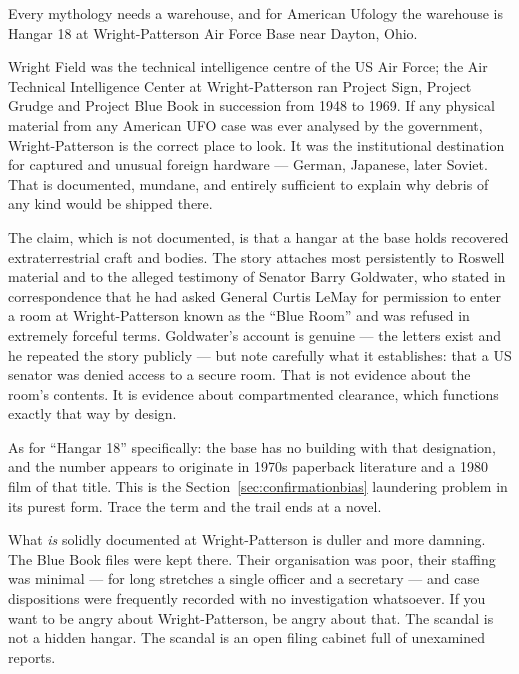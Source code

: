 Every mythology needs a warehouse, and for American Ufology the warehouse is Hangar 18 at
Wright-Patterson Air Force Base near Dayton, Ohio.

Wright Field was the technical intelligence centre of the US Air Force; the Air Technical
Intelligence Center at Wright-Patterson ran Project Sign, Project Grudge and Project Blue
Book in succession from 1948 to 1969. If any physical material from any American UFO case
was ever analysed by the government, Wright-Patterson is the correct place to look. It was
the institutional destination for captured and unusual foreign hardware --- German,
Japanese, later Soviet. That is documented, mundane, and entirely sufficient to explain
why debris of any kind would be shipped there.

The claim, which is not documented, is that a hangar at the base holds recovered
extraterrestrial craft and bodies. The story attaches most persistently to Roswell
material and to the alleged testimony of Senator Barry Goldwater, who stated in
correspondence that he had asked General Curtis LeMay for permission to enter a room at
Wright-Patterson known as the ``Blue Room'' and was refused in extremely forceful terms.
Goldwater's account is genuine --- the letters exist and he repeated the story publicly ---
but note carefully what it establishes: that a US senator was denied access to a secure
room. That is not evidence about the room's contents. It is evidence about compartmented
clearance, which functions exactly that way by design.

As for ``Hangar 18'' specifically: the base has no building with that designation, and the
number appears to originate in 1970s paperback literature and a 1980 film of that title.
This is the Section~\ref{sec:confirmationbias} laundering problem in its purest form. Trace the term and the trail
ends at a novel.

What \emph{is} solidly documented at Wright-Patterson is duller and more damning. The Blue
Book files were kept there. Their organisation was poor, their staffing was minimal --- for
long stretches a single officer and a secretary --- and case dispositions were frequently
recorded with no investigation whatsoever. If you want to be angry about
Wright-Patterson, be angry about that. The scandal is not a hidden hangar. The scandal is
an open filing cabinet full of unexamined reports.

